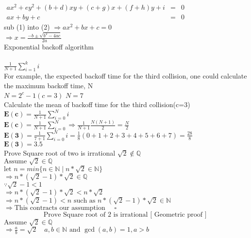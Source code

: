\documentclass{book}
\begin{document}
\noindent
$
\begin{array}{lcl}
ax^{2} + ey^{2} + (b+d)xy + (c+g)x + (f+h)y + i &=& 0\\
ax + by + c &=& 0
\end{array}
$\\
sub (1) into (2) 
$\Rightarrow ax^{2} + bx + c = 0$\\
$\Rightarrow x = \frac{-b \pm \sqrt{b^{2} - 4ac}}{2a}$
\\

Exponential backoff algorithm\\
\\
$\frac{1}{N+1} \sum_{i=1}^{k}i$\\
For example, the expected backoff time for the third collision, one could 
calculate the maximum backoff time, N\\
$N = 2^{c} - 1 (c = 3)$
$N = 7$\\
Calculate the mean of backoff time for the third collision(c=3)\\
$\mathbf{E(c)} = \frac{1}{N+1}\sum_{i=0}^{N} i$\\
$\mathbf{E(c)} = \frac{1}{N+1}\sum_{i=0}^{N} \Rightarrow \frac{1}{N+1} \frac{N(N+1)}{2} = \frac{N}{2}$\\
$\mathbf{E(3)} = \frac{1}{7+1}\sum_{i=0}^{N} i = \frac{1}{8}(0+1+2+3+4+5+6+7) = \frac{28}{8}$\\
$\mathbf{E(3)} = 3.5$\\

Prove Square root of two is irrational
$\sqrt{2} \notin \mathbb{Q}$\\
$\text{Assume } \sqrt{2} \in \mathbb{Q}$\\
$\text{let }n = min\{ n \in \mathbb{N} \mid n*\sqrt{2} \in \mathbb{N}\}$\\
$\Rightarrow n*(\sqrt{2} - 1)*\sqrt{2} \in \mathbb{Q}$\\
$\because \sqrt{2} - 1 < 1$\\
$\Rightarrow n*(\sqrt{2} - 1)*\sqrt{2} < n*\sqrt{2}$\\
$\Rightarrow n*(\sqrt{2} - 1) < n \text{ such as } n*(\sqrt{2} - 1)*\sqrt{2} \in \mathbb{N}$\\
$\Rightarrow \text{This contracts our assumption } \quad \square$\\

\pagebreak
\noindent
\[ \text{Prove Square root of 2 is irrational} \text{ [ Geometric proof ] }\]
$\text{Assume } \sqrt{2} \in \mathbb{Q}$\\
$\Rightarrow \frac{a}{b} = \sqrt{2} \quad a, b \in \mathbb{N} \text{ and } \gcd(a, b) = 1, a > b$\\
\end{document}
